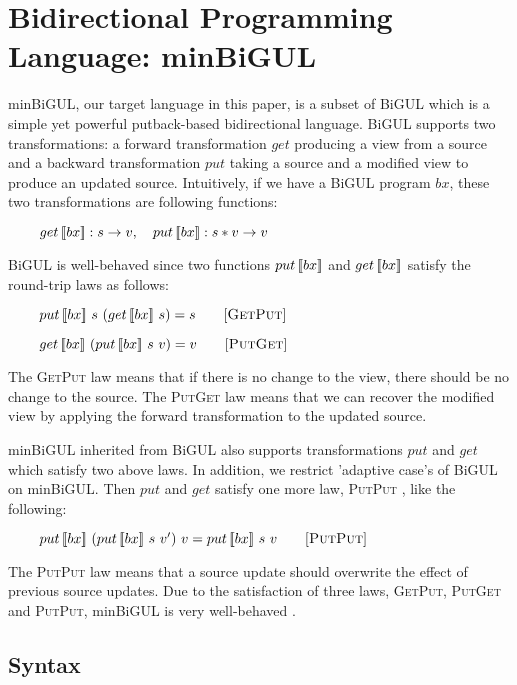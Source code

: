 \section{Bidirectional Programming Language: minBiGUL} \label{sect:minbigul}

minBiGUL, our target language in this paper, is a subset of BiGUL which is a simple yet powerful putback-based bidirectional language. BiGUL supports two transformations: a forward transformation $get$ producing a view from a source and a backward transformation $put$ taking a source and a modified view to produce an updated source. Intuitively, if we have a BiGUL program $bx$, these two transformations are following functions:

 \smallvspace
    $\hspace*{3mm} \ \quad get \, [\![bx]\!] : s \to v, \quad put \, [\![bx]\!] : s * v \to v$
 \smallvspace
 
BiGUL is well-behaved \cite{Pacheco:2014:MCP:2543728.2543737} since two functions $put \, [\![bx]\!]$ and $get \, [\![bx]\!]$ satisfy the round-trip laws as follows:

\smallvspace
    $\hspace*{3mm} \ \quad put \, [\![bx]\!] \ s \ (get \, [\![bx]\!] \ s) = s \qquad [\textsc{GetPut}]$
    
    $\hspace*{3mm} \ \quad get \, [\![bx]\!] \ (put \, [\![bx]\!] \ s \ v) = v \qquad [\textsc{PutGet}]$
\smallvspace

The \textsc{GetPut} law means that if there is no change to the view, there should be no change to the source. The \textsc{PutGet} law means that we can recover the modified view by applying the forward transformation to the updated source.

minBiGUL inherited from BiGUL also supports transformations $put$ and $get$ which satisfy two above laws. In addition, we restrict 'adaptive case's of BiGUL on minBiGUL. Then $put$ and $get$ satisfy one more law, \textsc{PutPut} \cite{Foster:2007:CBT:1232420.1232424}, like the following:

\smallvspace
$\hspace*{3mm} \ \quad put \, [\![bx]\!] \ (put \, [\![bx]\!] \ s \ v') \ v = put \, [\![bx]\!] \ s \ v \qquad [\textsc{PutPut}]$
\smallvspace

The \textsc{PutPut} law means that a source update should overwrite the effect of previous source updates. Due to the satisfaction of three laws, \textsc{GetPut}, \textsc{PutGet} and \textsc{PutPut}, minBiGUL is very well-behaved \cite{Foster:2007:CBT:1232420.1232424}.

\subsection{Syntax}

